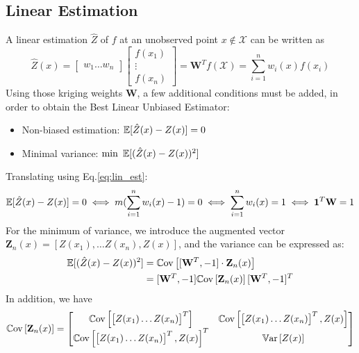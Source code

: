 \documentclass[../../Main_ManuscritThese.tex]{subfiles}
\begin{document}
\subsection{Linear Estimation}
\label{sec:linear_estimation}
A linear estimation $\hat{Z}$ of $f$ at an unobserved point $x\notin \mathcal{X}$ can be written as
\begin{equation}
  \label{eq:lin_est}
  \hat{Z}(x) =
  \begin{bmatrix}
    w_1 \dots w_n
    \end{bmatrix}
    \begin{bmatrix}
      f(x_1) \\ \vdots \\ f(x_n)
    \end{bmatrix} = \mathbf{W}^Tf(\mathcal{X}) = \sum_{i=1}^n w_i(x) f(x_i)
\end{equation}
Using those kriging weights $\mathbf{W}$, a few additional conditions must be added, in order to obtain the Best Linear Unbiased Estimator:
\begin{itemize}
\item Non-biased estimation: $\mathbb{E}[\hat{Z}(x) - Z(x)]=0$
\item Minimal variance: $\min~\mathbb{E}[(\hat{Z}(x) - Z(x))^2]$
\end{itemize}
Translating using Eq.\eqref{eq:lin_est}:
\begin{equation}
  \mathbb{E}[\hat{Z}(x) - Z(x)]=0 \iff m(\sum_{i=1}^n w_i(x)-1) = 0 \iff \sum_{i=1}^n w_i(x) = 1 \iff \mathbf{1}^T \mathbf{W} = 1
\end{equation}
For the minimum of variance, we introduce the augmented vector $\mathbf{Z}_n(x) = [Z(x_1),\dots Z(x_n), Z(x)]$, and
the variance can be expressed as:
\begin{align}
  \mathbb{E}[(\hat{Z}(x) - Z(x))^2] &= \mathbb{C}\mathrm{ov}\left[[\mathbf{W}^T, -1] \cdot \mathbf{Z}_n(x) \right] \\
                             &= [\mathbf{W}^T, -1] \mathbb{C}\mathrm{ov}\left[\mathbf{Z}_n(x) \right] [\mathbf{W}^T, -1]^T
\end{align}
In addition, we have
\begin{equation}
  \mathbb{C}\mathrm{ov}\left[\mathbf{Z}_n(x) \right] =
  \begin{bmatrix}
    \mathbb{C}\mathrm{ov}\left[
      \begin{bmatrix}
        Z(x_1) \dots Z(x_n)
      \end{bmatrix}^T\right]
    & \mathbb{C}\mathrm{ov}\left[
      \begin{bmatrix}
        Z(x_1) \dots Z(x_n)
      \end{bmatrix}^T, Z(x) \right]
  \\
  \mathbb{C}\mathrm{ov}\left[
    \begin{bmatrix}
      Z(x_1) \dots Z(x_n)
    \end{bmatrix}^T, Z(x) \right]^T & \mathbb{V}\mathrm{ar}\left[Z(x)\right]
  \end{bmatrix}
\end{equation}
\end{document}

